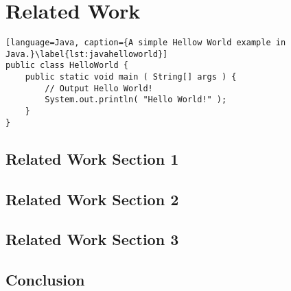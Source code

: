 \chapter{Related Work}
\label{sec:related}


\Blindtext[2][1]

\begin{lstlisting}[language=Java, caption={A simple Hellow World example in Java.}\label{lst:javahelloworld}]
public class HelloWorld {
	public static void main ( String[] args ) {
		// Output Hello World!
		System.out.println( "Hello World!" );
	}
}
\end{lstlisting}

\Blindtext[1][1]

\section{Related Work Section 1}
\label{sec:related:sec1}

\Blindtext[2][2]

\section{Related Work Section 2}
\label{sec:related:sec2}

\Blindtext[3][2]

\section{Related Work Section 3}
\label{sec:related:sec3}

\Blindtext[4][2]

\section{Conclusion}
\label{sec:related:conclusion}

\Blindtext[2][1]
